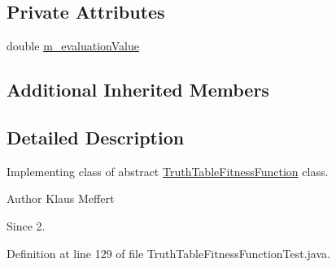\subsection*{Private Attributes}
\begin{DoxyCompactItemize}
\item 
double \hyperlink{classorg_1_1jgap_1_1impl_1_1fitness_1_1_truth_table_fitness_function_test_1_1_truth_table_fitness_function_impl_acddf969386c05548fa583d83d7da761a}{m\-\_\-evaluation\-Value}
\end{DoxyCompactItemize}
\subsection*{Additional Inherited Members}


\subsection{Detailed Description}
Implementing class of abstract \hyperlink{classorg_1_1jgap_1_1impl_1_1fitness_1_1_truth_table_fitness_function}{Truth\-Table\-Fitness\-Function} class.

\begin{DoxyAuthor}{Author}
Klaus Meffert 
\end{DoxyAuthor}
\begin{DoxySince}{Since}
2. 
\end{DoxySince}


Definition at line 129 of file Truth\-Table\-Fitness\-Function\-Test.\-java.



